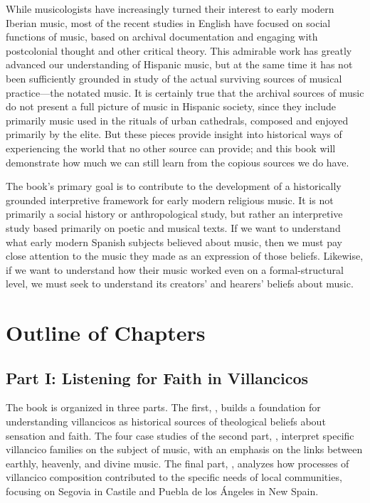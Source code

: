 \documentclass{vcbook-proposal}
\begin{document}
While musicologists have increasingly turned their interest to early modern Iberian music, most of the recent studies in English have focused on social functions of music, based on archival documentation and engaging with postcolonial thought and other critical theory.
This admirable work has greatly advanced our understanding of Hispanic music, but at the same time it has not been sufficiently grounded in study of the actual surviving sources of musical practice---the notated music.%
  \autocites{Torrente:PhD}{Baker:Harmony}{Irving:Colonial}
  {BakerKnighton:MusicUrbanSociety}
It is certainly true that the archival sources of music do not present a full picture of music in Hispanic society, since they include primarily music used in the rituals of urban cathedrals, composed and enjoyed primarily by the elite.
But these pieces provide insight into historical ways of experiencing the world that no other source can provide; and this book will demonstrate how much we can still learn from the copious sources we do have.

The book's primary goal is to contribute to the development of a historically grounded interpretive framework for early modern religious music.
It is not primarily a social history or anthropological study, but rather an interpretive study based primarily on poetic and musical texts.
If we want to understand what early modern Spanish subjects believed about music, then we must pay close attention to the music they made as an expression of those beliefs.
Likewise, if we want to understand how their music worked even on a formal-structural level, we must seek to understand its creators' and hearers' beliefs about music.


\section{Outline of Chapters}

\subsection{Part I: Listening for Faith in Villancicos}

The book is organized in three parts.
The first, , builds a foundation for understanding villancicos as historical sources of theological beliefs about sensation and faith.
The four case studies of the second part, , interpret specific villancico families on the subject of music, with an emphasis on the links between earthly, heavenly, and divine music.
The final part, , analyzes how processes of villancico composition contributed to the specific needs of local communities, focusing on Segovia in Castile and Puebla de los Ángeles in New Spain.
\end{document}
